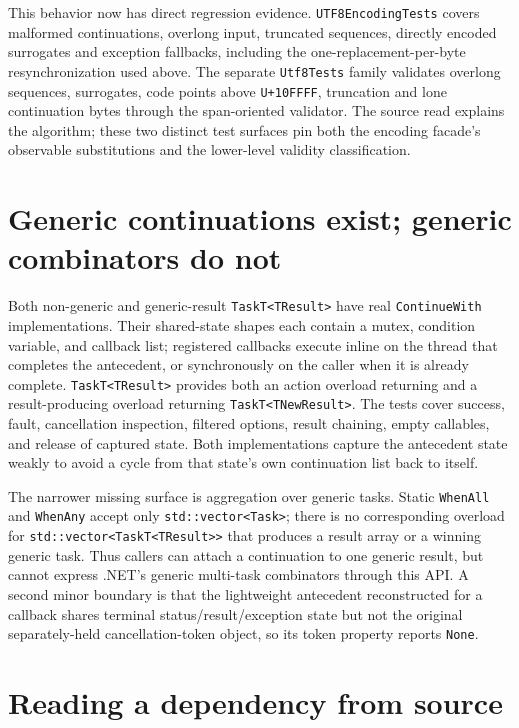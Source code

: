 This behavior now has direct regression evidence. \texttt{UTF8EncodingTests} covers malformed
continuations, overlong input, truncated sequences, directly encoded surrogates and exception
fallbacks, including the one-replacement-per-byte resynchronization used above. The separate
\texttt{Utf8Tests} family validates overlong sequences, surrogates, code points above
\texttt{U+10FFFF}, truncation and lone continuation bytes through the span-oriented validator.
The source read explains the algorithm; these two distinct test surfaces pin both the encoding
facade's observable substitutions and the lower-level validity classification.

\section{Generic continuations exist; generic combinators do not}

Both non-generic  and generic-result \texttt{TaskT<TResult>} have real
\texttt{ContinueWith} implementations. Their shared-state shapes each contain a mutex,
condition variable, and callback list; registered callbacks execute inline on the thread that
completes the antecedent, or synchronously on the caller when it is already complete.
\texttt{TaskT<TResult>} provides both an action overload returning  and a
result-producing overload returning \texttt{TaskT<TNewResult>}. The tests cover success, fault,
cancellation inspection, filtered options, result chaining, empty callables, and release of
captured state. Both implementations capture the antecedent state weakly to avoid a cycle from
that state's own continuation list back to itself.

The narrower missing surface is aggregation over generic tasks. Static \texttt{WhenAll} and
\texttt{WhenAny} accept only \texttt{std::vector<Task>}; there is no corresponding overload for
\texttt{std::vector<TaskT<TResult>>} that produces a result array or a winning generic task.
Thus callers can attach a continuation to one generic result, but cannot express .NET's generic
multi-task combinators through this API. A second minor boundary is that the lightweight
antecedent reconstructed for a callback shares terminal status/result/exception state but not
the original separately-held cancellation-token object, so its token property reports
\texttt{None}.

\section{Reading a dependency from source}

